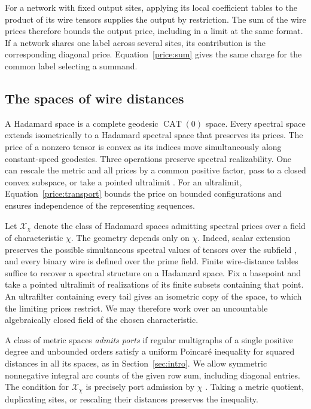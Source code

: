 For a network with fixed output sites, applying its local coefficient
tables to the product of its wire tensors supplies the output by
restriction. The sum of the wire prices therefore bounds the output
price, including in a limit at the same format. If a network shares
one label across several sites, its contribution is the corresponding
diagonal price. Equation~\eqref{price:sum} gives the same charge for
the common label selecting a summand.

\subsection{The spaces of wire distances}

A Hadamard space is a complete geodesic $\operatorname{CAT}(0)$ space.
Every spectral space extends isometrically to a Hadamard spectral
space that preserves its prices. The price of a nonzero tensor is
convex as its indices move simultaneously along constant-speed
geodesics. Three operations preserve spectral realizability. One can
rescale the metric and all prices by a common positive factor, pass
to a closed convex subspace, or take a pointed ultralimit
\cite[Theorem~, Proposition~
and Section~]{oaG}. For an ultralimit,
Equation~\eqref{price:transport} bounds the price on bounded
configurations and ensures independence of the representing sequences.

Let $\mathcal X_\chi$ denote the class of Hadamard spaces admitting
spectral prices over a field of characteristic $\chi$. The geometry
depends only on $\chi$. Indeed, scalar extension preserves the
possible simultaneous spectral values of tensors over the subfield
\cite[Lemma~]{oaG}, and every binary wire is
defined over the prime field. Finite wire-distance tables suffice to
recover a spectral structure on a Hadamard space. Fix a basepoint
and take a pointed ultralimit of realizations of its finite subsets
containing that point. An ultrafilter containing every tail gives an
isometric copy of the space, to which the limiting prices restrict.
We may therefore work over an uncountable algebraically closed field
of the chosen characteristic.

A class of metric spaces \emph{admits ports} if regular multigraphs
of a single positive degree and unbounded orders satisfy a uniform
Poincar\'e inequality for squared distances in all its spaces, as in
Section~\ref{sec:intro}. We allow symmetric nonnegative integral arc
counts of the given row sum, including diagonal entries. The condition
for $\mathcal X_\chi$ is precisely port admission by $\chi$
\cite[Definition~]{oaG}. Taking a metric quotient,
duplicating sites, or rescaling their distances preserves the inequality.

